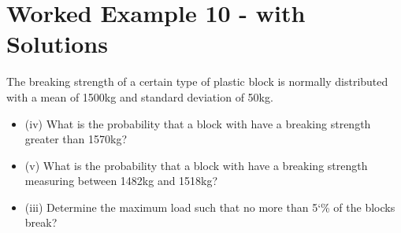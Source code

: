 \documentclass[]{report}
\begin{document}
\section{Worked Example 10 - with Solutions}

The breaking strength of a certain type of plastic block is normally distributed with a
mean of 1500kg and standard deviation of 50kg. 

\begin{itemize}
	\item (iv)	What is the probability that a block with have a breaking strength greater than 1570kg?
	\item (v)	What is the probability that a block with have a breaking strength measuring between 1482kg and 1518kg?
	\item (iii)	Determine the maximum load such that no more than 5`\% of the blocks break?
\end{itemize}
\end{document}
